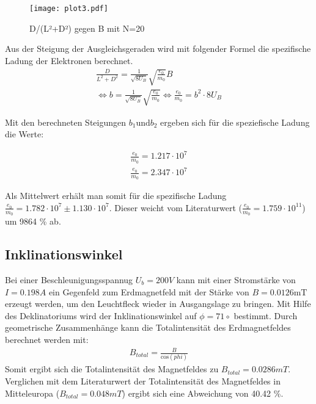 \FloatBarrier
\begin{figure}
  \centering
  \texttt{[image: plot3.pdf]}
  \caption{D/(L²+D²) gegen B mit N=20}
  \label{fig:plot3}
\end{figure}

Aus der Steigung der Ausgleichsgeraden wird mit folgender Formel die spezifische Ladung der Elektronen berechnet.
\begin{align*}
  \frac{D}{L^2+D^2} = \frac{1}{\sqrt{8 U_B}} \sqrt{\frac{e_0}{m_0}} B \\
  \Leftrightarrow b = \frac{1}{\sqrt{8 U_B}}\sqrt{\frac{e_0}{m_0}}
  \Leftrightarrow \frac{e_0}{m_0} = b^2 \cdot 8 U_B
\end{align*}

Mit den berechneten Steigungen $b_1 \text{und} b_2$ ergeben sich für die speziefische Ladung die Werte:

\begin{align*}
  \frac{e_0}{m_0} = 1.217 \cdot 10^7 \\
  \frac{e_0}{m_0} = 2.347 \cdot 10^7
\end{align*}

Als Mittelwert erhält man somit für die spezifische Ladung $\frac{e_0}{m_0} = 1.782 \cdot 10^7 \pm 1.130 \cdot 10^7 $.
Dieser weicht vom Literaturwert ($\frac{e_0}{m_0} = 1.759 \cdot 10^{11}$) um 9864 \% ab.

\subsection{Inklinationswinkel}
\label{inklination}

Bei einer Beschleunigungsspannug $U_b = 200V$ kann mit einer Stromstärke von $I = 0.198 A$ ein Gegenfeld zum Erdmagnetfeld mit der Stärke von $B = 0.0126 \text{mT}$ erzeugt werden, um den Leuchtfleck wieder in Ausgangslage zu bringen.
Mit Hilfe des Deklinatoriums wird der Inklinationswinkel auf $\phi = 71 \circ$ bestimmt.
Durch geometrische Zusammenhänge kann die Totalintensität des Erdmagnetfeldes berechnet werden mit:
\begin{align*}
  B_{total} = \frac{B}{\text{cos}(phi)}
\end{align*}
Somit ergibt sich die Totalintensität des Magnetfeldes zu $B_{total} = 0.0286 mT$.
Verglichen mit dem Literaturwert der Totalintensität des Magnetfeldes in Mitteleuropa ($B_{total} = 0.048 mT$) ergibt sich eine Abweichung von 40.42 \%.
